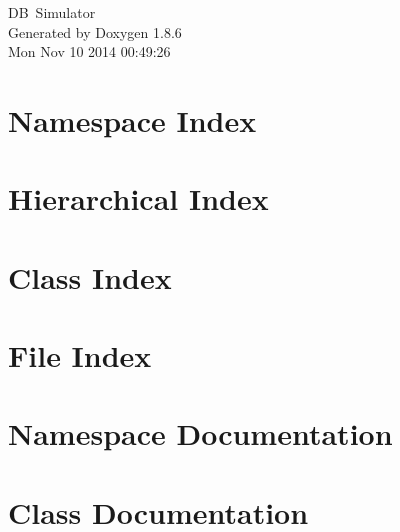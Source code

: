 \documentclass[twoside]{book}
\newcommand{\clearemptydoublepage}{%
  \newpage{\pagestyle{empty}\cleardoublepage}%
}
\begin{document}
\hypersetup{pageanchor=false}
\begin{titlepage}
\vspace*{7cm}
\begin{center}%
{\Large D\-B \-Simulator }\\
\vspace*{1cm}
{\large Generated by Doxygen 1.8.6}\\
\vspace*{0.5cm}
{\small Mon Nov 10 2014 00:49:26}\\
\end{center}
\end{titlepage}
\clearemptydoublepage
\tableofcontents
\clearemptydoublepage
{}
\hypersetup{pageanchor=true}

\chapter{Namespace Index}

\chapter{Hierarchical Index}

\chapter{Class Index}

\chapter{File Index}

\chapter{Namespace Documentation}


\chapter{Class Documentation}















\end{document}

